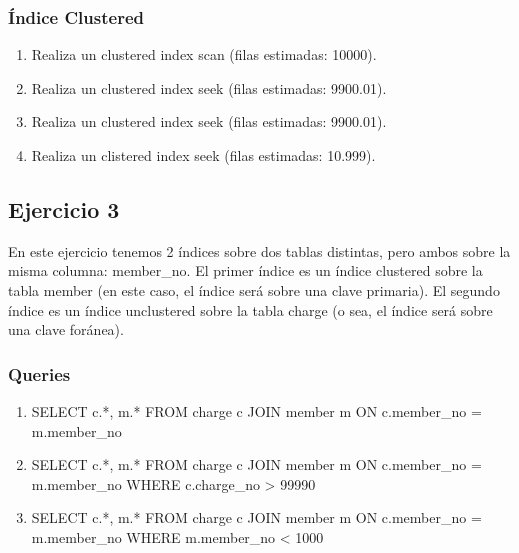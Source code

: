 \subsubsection{Índice Clustered}
\begin{enumerate}[label=(\alph*)]
  \item Realiza un clustered index scan (filas estimadas: 10000).
  \item Realiza un clustered index seek (filas estimadas: 9900.01).
  \item Realiza un clustered index seek (filas estimadas: 9900.01).
  \item Realiza un clistered index seek (filas estimadas: 10.999).
\end{enumerate}


\subsection{Ejercicio 3}

En este ejercicio tenemos 2 índices sobre dos tablas distintas, pero ambos sobre la misma columna: member\_no. El primer índice es un índice clustered sobre la tabla member (en este caso, el índice será sobre una clave primaria). El segundo índice es un índice unclustered sobre la tabla charge (o sea, el índice será sobre una clave foránea).

\subsubsection{Queries}

\begin{enumerate}[label=(\alph*)]
\item SELECT c.*, m.* FROM charge c JOIN member m ON c.member\_no = m.member\_no
\item SELECT c.*, m.* FROM charge c JOIN member m ON c.member\_no = m.member\_no WHERE c.charge\_no > 99990
\item SELECT c.*, m.* FROM charge c JOIN member m ON c.member\_no = m.member\_no WHERE m.member\_no < 1000
\end{enumerate}

